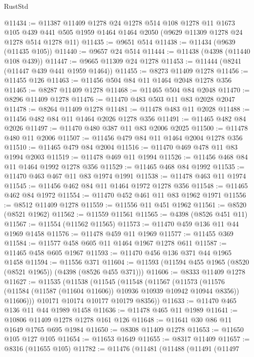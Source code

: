 \begin{lexlean}{RustStd}
\begin{coremodule}
@11434 := @11387
    @11409
    @1278
    @24
    @1278
    @514
    @108
    @1278
    @11
    @1673
    @105
    @439
    @441
    @505
    @1959
    @1464
    @1464
    @2050
    (@9629 @11309 @1278 @24 @1278 @514 @1278 @11)
@11435 := @9651 @514
@11438 := @11434 (@9639 (@11435 @105))
@11440 := @9657 @24 @514
@11444 := @11438 (@4398 (@11440 @108 @439))
@11447 := @9665 @11309 @24 @1278
@11453 := @11444 (@8241 (@11447 @439 @441 @1959 @1464))
@11455 := @8273 @11409 @1278
@11456 := @11455 @126
@11463 := @11456 @504 @84 @11 @1464 @2048 @1278 @356
@11465 := @8287 @11409 @1278
@11468 := @11465 @504 @84 @2048
@11470 := @8296 @11409 @1278
@11476 := @11470 @483 @503 @11 @83 @2028 @2047
@11478 := @8264 @11409 @1278
@11481 := @11478 @483 @11 @2028
@11488 := @11456 @482 @84 @11 @1464 @2026 @1278 @356
@11491 := @11465 @482 @84 @2026
@11497 := @11470 @480 @387 @11 @83 @2006 @2025
@11500 := @11478 @480 @11 @2006
@11507 := @11456 @479 @84 @11 @1464 @2004 @1278 @356
@11510 := @11465 @479 @84 @2004
@11516 := @11470 @469 @478 @11 @83 @1994 @2003
@11519 := @11478 @469 @11 @1994
@11526 := @11456 @468 @84 @11 @1464 @1992 @1278 @356
@11529 := @11465 @468 @84 @1992
@11535 := @11470 @463 @467 @11 @83 @1974 @1991
@11538 := @11478 @463 @11 @1974
@11545 := @11456 @462 @84 @11 @1464 @1972 @1278 @356
@11548 := @11465 @462 @84 @1972
@11554 := @11470 @452 @461 @11 @83 @1962 @1971
@11556 := @8512 @11409 @1278
@11559 := @11556 @11 @451 @1962
@11561 := @8520 (@8521 @1962)
@11562 := @11559 @11561
@11565 := @4398 (@8526 @451 @11)
@11567 := @11554 (@11562 @11565)
@11573 := @11470 @459 @136 @11 @44 @1969 @1458
@11576 := @11478 @459 @11 @1969
@11577 := @11455 @369
@11584 := @11577 @458 @605 @11 @1464 @1967 @1278 @611
@11587 := @11465 @458 @605 @1967
@11593 := @11470 @456 @136 @371 @44 @1965 @1458
@11594 := @11556 @371
@11604 := @11593 (@11594 @455 @1965 (@8520 (@8521 @1965)) (@4398 (@8526 @455 @371)))
@11606 := @8333 @11409 @1278
@11627 := @11535
    (@11538
      (@11545
        (@11548
          (@11567
            (@11573
              (@11576 (@11584 (@11587 (@11604 @11606)) @10936 @10939 @10942 @10944 @8356))
              @11606)))
        @10171
        @10174
        @10177
        @10179
        @8356))
@11633 := @11470 @465 @136 @11 @44 @1989 @1458
@11636 := @11478 @465 @11 @1989
@11641 := @10806 @11409 @1278 @1278 @161 @126
@11648 := @11641 @30 @86 @11 @1649 @1765 @695 @1984
@11650 := @8308 @11409 @1278
@11653 := @11650 @105 @127 @105
@11654 := @11653 @1649
@11655 := @8317 @11409
@11657 := @8316 (@11655 @105)
@11782 := @11476
    (@11481
      (@11488
        (@11491
          (@11497

\end{coremodule}
\end{lexlean}
